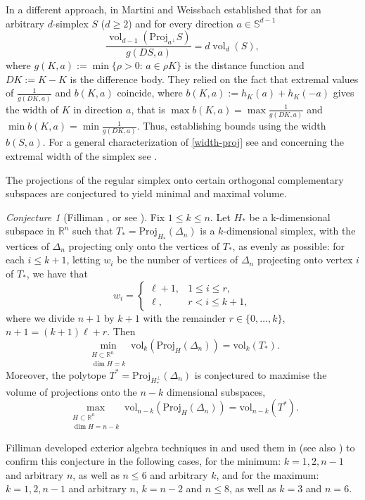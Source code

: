 \documentclass[10pt]{amsart}
\newcommand{\gr}{\geqslant}
\newcommand{\1}{\textbf{1}}
\numberwithin{equation}{section} %
\theoremstyle{remark}
\newtheorem{conjecture}[theorem]{Conjecture}
\theoremstyle{definition}
\begin{document}
In a different approach, in \cite{martini1992quermasses} Martini and Weissbach established that for an arbitrary $d$-simplex $S$ ($d\gr2$) and for every  direction $a\in\mathbb{S}^{d-1}$ 
\begin{equation}\label{width-proj}
\frac{\operatorname{vol}_{d-1}\left(\text{Proj}_{a^{\perp}}S \right)}{g(DS,a)}=d\operatorname{vol}_d(S),
\end{equation}
where $g(K,a):=\min \{\rho>0:\, a\in \rho K \}$ is the distance function and $DK:=K-K$ is the difference body. They relied on the fact that extremal values of $\frac{1}{g(DK,a)}$ and $b(K,a)$ coincide, where $b(K,a):=h_{K}(a)+h_{K}(-a)$ gives the width of $K$ in direction $a$, that is $\max b(K,a)=\max \frac{1}{g(DK,a)}$ and $\min b(K,a)=\min \frac{1}{g(DK,a)}$.  Thus, establishing bounds using the width $b(S,a)$. For a general characterization of \eqref{width-proj} see \cite{martini1991convex} and concerning the extremal width of the simplex see \cite{alexander1977width,gritzmann1992inner,har2023width,weissbach1988schranken}. 

The projections of the regular simplex onto
certain orthogonal complementary subspaces are conjectured to yield minimal and maximal volume.
\begin{conjecture}[Filliman \cite{filliman1990extreme}, or see \cite{nayar2023extremal}] \label{conj:Filliman}
Fix $1 \le k \le n$. Let $H_{\ast}$ be a k-dimensional subspace in $\mathbb{R}^n$ such that $T_{\ast} = \text{Proj}_{H_{\ast}}(\Delta_n)$ is a $k$-dimensional simplex, with the vertices of $\Delta_n$ projecting only onto the vertices of $T_{\ast}$, as evenly as possible: for each $i \le k + 1$, letting $w_i$ be the number of vertices of $\Delta_n$ projecting onto vertex $i$ of $T_{\ast}$, we have that
\[
w_i = \begin{cases} \ell + 1, & 1 \le i \le r, \\ \ell, & r < i \le k + 1, \end{cases}
\]
where we divide $n + 1$ by $k + 1$ with the remainder $r \in \{0, \ldots, k\}$, $n + 1 = (k + 1)\ell + r$. Then
\[
\min_{\substack{H \subset \mathbb{R}^n \\ \dim H=k}} \text{vol}_k(\text{Proj}_H(\Delta_n)) = \text{vol}_k(T_{\ast}).
\]
Moreover, the polytope $T^{\ast} = \text{Proj}_{H_{\ast}^{\perp}}(\Delta_n)$ is conjectured to maximise the volume of projections onto the $n - k$ dimensional subspaces,
\[
\max_{\substack{H \subset \mathbb{R}^n \\ \dim H=n-k}} \text{vol}_{n-k}(\text{Proj}_H(\Delta_n)) = \text{vol}_{n-k}(T^{\ast}).
\]
\end{conjecture}
Filliman developed exterior algebra techniques in \cite{filliman1992volume} and used them in \cite{filliman1990extreme} (see also \cite{filliman1988largest,filliman1990exterior}) to confirm this conjecture in the following cases, for the minimum: $k = 1, 2, n-1$ and arbitrary $n$, as well as $n \le 6$ and arbitrary $k$, and for the maximum: $k = 1, 2, n - 1$ and arbitrary $n$, $k = n - 2$ and $n \le 8$, as well as $k = 3$ and $n = 6$. 
\end{document}
